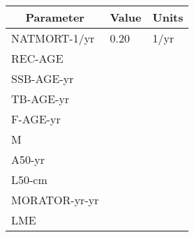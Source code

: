 \begin{table}[htb]
\centering
\begin{tabular}{lll}
\toprule
\multicolumn{1}{c}{\textbf{Parameter}} & \multicolumn{1}{c}{\textbf{Value}} & \multicolumn{1}{c}{\textbf{Units}} \\
\midrule
NATMORT-1/yr  & 0.20 & 1/yr \\
REC-AGE       &      &      \\
SSB-AGE-yr    &      &      \\
TB-AGE-yr     &      &      \\
F-AGE-yr      &      &      \\
M             &      &      \\
A50-yr        &      &      \\
L50-cm        &      &      \\
MORATOR-yr-yr &      &      \\
LME           &      &      \\
\bottomrule
\end{tabular}
\end{table}
